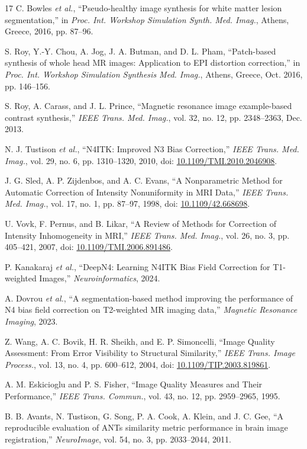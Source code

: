 \documentclass[conference]{IEEEtran}
\begin{document}
\begin{thebibliography}{17}
C. Bowles \textit{et al.}, ``Pseudo-healthy image synthesis for white matter lesion segmentation,'' in \textit{Proc. Int. Workshop Simulation Synth. Med. Imag.}, Athens, Greece, 2016, pp. 87--96.

S. Roy, Y.-Y. Chou, A. Jog, J. A. Butman, and D. L. Pham, ``Patch-based synthesis of whole head MR images: Application to EPI distortion correction,'' in \textit{Proc. Int. Workshop Simulation Synthesis Med. Imag.}, Athens, Greece, Oct. 2016, pp. 146--156.

S. Roy, A. Carass, and J. L. Prince, ``Magnetic resonance image example-based contrast synthesis,'' \textit{IEEE Trans. Med. Imag.}, vol. 32, no. 12, pp. 2348--2363, Dec. 2013.

N. J. Tustison \textit{et al.}, ``N4ITK: Improved N3 Bias Correction,'' \textit{IEEE Trans. Med. Imag.}, vol. 29, no. 6, pp. 1310--1320, 2010, doi: \href{https://doi.org/10.1109/TMI.2010.2046908}{10.1109/TMI.2010.2046908}.

J. G. Sled, A. P. Zijdenbos, and A. C. Evans, ``A Nonparametric Method for Automatic Correction of Intensity Nonuniformity in MRI Data,'' \textit{IEEE Trans. Med. Imag.}, vol. 17, no. 1, pp. 87--97, 1998, doi: \href{https://doi.org/10.1109/42.668698}{10.1109/42.668698}.

U. Vovk, F. Pernus, and B. Likar, ``A Review of Methods for Correction of Intensity Inhomogeneity in MRI,'' \textit{IEEE Trans. Med. Imag.}, vol. 26, no. 3, pp. 405--421, 2007, doi: \href{https://doi.org/10.1109/TMI.2006.891486}{10.1109/TMI.2006.891486}.

P. Kanakaraj \textit{et al.}, ``DeepN4: Learning N4ITK Bias Field Correction for T1-weighted Images,'' \textit{Neuroinformatics}, 2024.

A. Dovrou \textit{et al.}, ``A segmentation-based method improving the performance of N4 bias field correction on T2-weighted MR imaging data,'' \textit{Magnetic Resonance Imaging}, 2023.

Z. Wang, A. C. Bovik, H. R. Sheikh, and E. P. Simoncelli, ``Image Quality Assessment: From Error Visibility to Structural Similarity,'' \textit{IEEE Trans. Image Process.}, vol. 13, no. 4, pp. 600--612, 2004, doi: \href{https://doi.org/10.1109/TIP.2003.819861}{10.1109/TIP.2003.819861}.

A. M. Eskicioglu and P. S. Fisher, ``Image Quality Measures and Their Performance,'' \textit{IEEE Trans. Commun.}, vol. 43, no. 12, pp. 2959--2965, 1995.

B. B. Avants, N. Tustison, G. Song, P. A. Cook, A. Klein, and J. C. Gee, ``A reproducible evaluation of ANTs similarity metric performance in brain image registration,'' \textit{NeuroImage}, vol. 54, no. 3, pp. 2033--2044, 2011.

\end{thebibliography}
\end{document}
